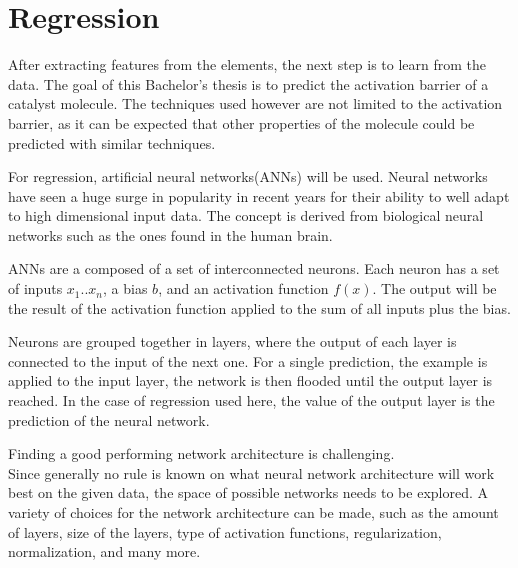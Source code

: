 
\chapter{Regression}
\label{ch:Regression}

After extracting features from the elements, the next step is to learn from the data.
The goal of this Bachelor's thesis is to predict the activation barrier of a catalyst molecule.
The techniques used however are not limited to the activation barrier, 
as it can be expected that other properties of the molecule could be predicted with similar techniques.

For regression, artificial neural networks(ANNs) will be used.
Neural networks have seen a huge surge in popularity in recent years for their ability to well
adapt to high dimensional input data.
The concept is derived from biological neural networks such as the ones found in the human brain.

ANNs are a composed of a set of interconnected neurons.
Each neuron has a set of inputs $x_1 .. x_n$, a bias $b$, and an activation function $f(x)$.
The output will be the result of the activation function applied to the sum of all inputs plus the bias.

Neurons are grouped together in layers, where the output of each layer is connected to the input of the next one.
For a single prediction, the example is applied to the input layer, the network is then flooded until the output layer is reached.
In the case of regression used here, the value of the output layer is the prediction of the neural network.

Finding a good performing network architecture is challenging. \\
Since generally no rule is known on what neural network architecture will work best on the given data, the space of possible networks needs to be explored.
A variety of choices for the network architecture can be made, such as the amount of layers, size of the layers, type of activation functions, regularization, normalization, and many more.

